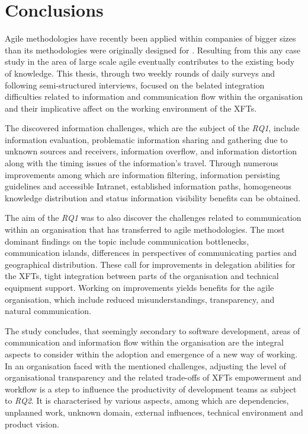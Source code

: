\chapter{Conclusions}
\label{chap:conclusions}

Agile methodologies have recently been applied within companies of bigger sizes than its methodologies were originally designed for \citep{kniberg2012agilespotify, benefield2008agileenterprise}. Resulting from this any case study in the area of large scale agile eventually contributes to the existing body of knowledge. This thesis, through two weekly rounds of daily surveys and following semi-structured interviews, focused on the belated integration difficulties related to information and communication flow within the organisation and their implicative affect on the working environment of the \acp{XFT}.

The discovered information challenges, which are the subject of the \emph{RQ1}, include information evaluation, problematic information sharing and gathering due to unknown sources and receivers, information overflow, and information distortion along with the timing issues of the information's travel. Through numerous improvements among which are information filtering, information persisting guidelines and accessible Intranet, established information paths, homogeneous knowledge distribution and status information visibility benefits can be obtained.

The aim of the \emph{RQ1} was to also discover the challenges related to communication within an organisation that has transferred to agile methodologies. The most dominant findings on the topic include communication bottlenecks, communication islands, differences in perspectives of communicating parties and geographical distribution. These call for improvements in delegation abilities for the \acp{XFT}, tight integration between parts of the organisation and technical equipment support. Working on improvements yields benefits for the agile organisation, which include reduced misunderstandings, transparency, and natural communication.

The study concludes, that seemingly secondary to software development, areas of communication and information flow within the organisation are the integral aspects to consider within the adoption and emergence of a new way of working. In an organisation faced with the mentioned challenges, adjusting the level of organisational transparency and the related trade-offs of \acp{XFT} empowerment and workflow is a step to influence the productivity of development teams as subject to \emph{RQ2}. It is characterised by various aspects, among which are dependencies, unplanned work, unknown domain, external influences, technical environment and product vision.

